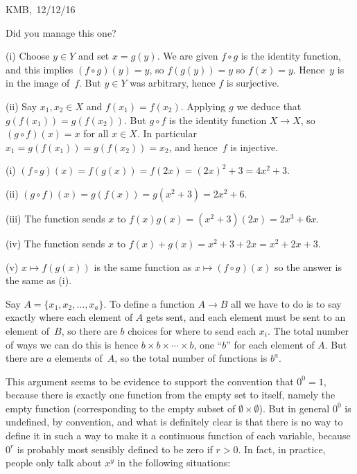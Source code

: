 \documentclass[10pt]{article}
\begin{document}
\begin{flushright} KMB,\ 12/12/16\end{flushright}


\medskip{} Did you manage this one?

\medskip{} 

(i) Choose $y\in Y$ and set $x=g(y)$. We are given $f\circ g$ is the identity function, and this implies $(f\circ g)(y)=y$, so $f(g(y))=y$ so $f(x)=y$. Hence~$y$ is in the image of~$f$. But $y\in Y$ was arbitrary, hence $f$ is surjective.

(ii) Say $x_1,x_2\in X$ and $f(x_1)=f(x_2)$. Applying $g$ we deduce that $g(f(x_1))=g(f(x_2))$. But $g\circ f$ is the identity function $X\to X$, so $(g\circ f)(x)=x$ for all $x\in X$. In particular $x_1=g(f(x_1))=g(f(x_2))=x_2$, and hence~$f$ is injective.

\medskip{} 

(i) $(f\circ g)(x)=f(g(x))=f(2x)=(2x)^2+3=4x^2+3$.

(ii) $(g\circ f)(x)=g(f(x))=g(x^2+3)=2x^2+6$.

(iii) The function sends $x$ to $f(x)g(x)=(x^2+3)(2x)=2x^3+6x$.

(iv) The function sends $x$ to $f(x)+g(x)=x^2+3+2x=x^2+2x+3$.

(v) $x\mapsto f(g(x))$ is the same function as $x\mapsto (f\circ g)(x)$ so the answer is the same as (i).

\medskip{} Say $A=\{x_1,x_2,\ldots,x_a\}$. To define a function $A\to B$ all we have to do is to say exactly where each element of $A$ gets sent, and each element must be sent to an element of~$B$, so there are $b$ choices for where to send each $x_i$. The total number of ways we can do this is hence $b\times b\times\cdots\times b$, one ``$b$'' for each element of $A$. But there are $a$ elements of~$A$, so the total number of functions is $b^a$.

This argument seems to be evidence to support the convention that $0^0=1$, because there is exactly one function from the empty set to itself, namely the empty function (corresponding to the empty subset of $\emptyset\times\emptyset$). But in general $0^0$ is undefined, by convention, and what is definitely clear is that there is no way to define it in such a way to make it a continuous function of each variable, because $0^r$ is probably most sensibly defined to be zero if $r>0$. In fact, in practice, people only talk about $x^y$ in the following situations:
\end{document}
